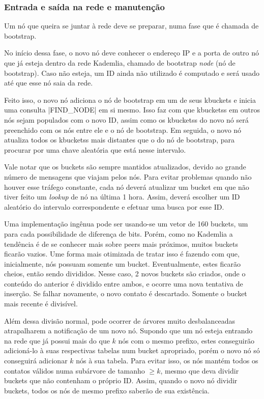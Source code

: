 
\subsubsection*{Entrada e saída na rede e manutenção}

Um nó que queira se juntar à rede deve se preparar, numa fase que é chamada de
\gls{bootstrap}.

No início dessa fase, o novo nó deve conhecer o endereço IP e a porta de outro nó que
já esteja dentro da rede Kademlia, chamado de \gls*{bootstrap} \emph{node} (nó de
\gls*{bootstrap}). Caso não esteja, um ID ainda não utilizado é computado e será usado
até que esse nó saia da rede.

Feito isso, o novo nó adiciona o nó de \gls*{bootstrap} em um de seus \glspl*{kbucket}
e inicia uma consulta \bverb|FIND_NODE| em si mesmo. Isso faz com que \glspl*{kbuckets}
em outros nós sejam populados com o novo ID, assim como os \glspl*{kbuckets} do novo nó
será preenchido com os nós entre ele e o nó de \gls*{bootstrap}. Em seguida, o novo
nó atualiza todos os \glspl*{kbuckets} mais distantes que o do nó de \gls*{bootstrap},
para procurar por uma chave aleatória que está nesse intervalo.

Vale notar que os \glspl*{bucket} são sempre mantidos atualizados, devido ao grande
número de mensagens que viajam pelos nós. Para evitar problemas quando não houver esse
tráfego constante, cada nó deverá atualizar um \gls*{bucket} em que não tiver feito um
\emph{lookup} de nó na última 1 hora. Assim, deverá escolher um ID aleatório do
intervalo correspondente e efetuar uma busca por esse ID.

Uma implementação ingênua pode ser usando-se um vetor de 160 \glspl*{bucket}, um para
cada possibilidade de diferença de bits. Porém, como no Kademlia a tendência é de se
conhecer mais sobre \glspl*{peer} mais próximos, muitos \glspl*{bucket} ficarão vazios.
Ume forma mais otimizada de tratar isso é fazendo com que, inicialmente, nós possuam
somente um \gls*{bucket}. Eventualmente, estes ficarão cheios, então sendo divididos.
Nesse caso, 2 novos \glspl*{bucket} são criados, onde o conteúdo do anterior é dividido
entre ambos, e ocorre uma nova tentativa de inserção. Se falhar novamente, o novo
contato é descartado. Somente o \gls*{bucket} mais recente é divisível.

\newpage
Além dessa divisão normal, pode ocorrer de árvores muito desbalanceadas atrapalharem a
notificação de um novo nó. Supondo que um nó esteja entrando na rede que já possui mais
do que $k$ nós com o mesmo prefixo, estes conseguirão adicioná-lo à suas respectivas
tabelas num \gls*{bucket} apropriado, porém o novo nó só conseguirá adicionar $k$ nós à
sua tabela. Para evitar isso, os nós mantém todos os contatos válidos numa subárvore de
tamanho $\geq k$, mesmo que deva dividir \glspl*{bucket} que não contenham o próprio
ID. Assim, quando o novo nó dividir \glspl*{bucket}, todos os nós de mesmo prefixo
saberão de sua existência.

